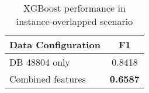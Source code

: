 \begin{table}[ht]
  \centering
  \caption{XGBoost performance in instance-overlapped scenario}
  \label{tab:vfl_xgboost_prediction_results}
  \begin{tabular}{lc}
  \toprule
  \textbf{Data Configuration} & \textbf{F1} \\
  \midrule
  DB 48804 only & 0.8418 \\
  Combined features & \textbf{0.6587} \\
  \bottomrule
  \end{tabular}
  \end{table}